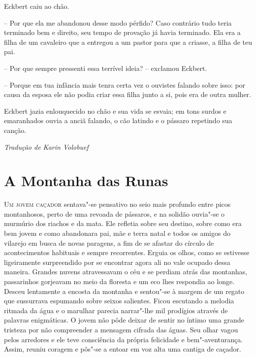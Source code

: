  Eckbert caiu ao chão.

 -- Por que ela me abandonou desse modo pérfido? Caso contrário
tudo teria terminado bem e direito, seu tempo de provação já havia
terminado. Ela era a filha de um cavaleiro que a entregou a um pastor
para que a criasse, a filha de teu pai.

 -- Por que sempre pressenti essa terrível ideia? -- exclamou
Eckbert.

 -- Porque em tua infância mais tenra certa vez o ouvistes falando
sobre isso: por causa da esposa ele não podia criar essa filha junto a
si, pois era de outra mulher.

 Eckbert jazia enlouquecido no chão e sua vida se esvaia; em tons surdos
e emaranhados ouvia a anciã falando, o cão latindo e o pássaro repetindo sua canção.
\medskip

\hfill\textit{Tradução de Karin Volobuef}



\chapter{A Montanha das Runas}

\textsc{Um jovem caçador} sentava"-se pensativo no seio mais profundo entre picos
montanhosos, perto de uma revoada de pássaros, e na solidão ouvia"-se o
murmúrio dos riachos e da mata. Ele refletia sobre seu destino, sobre
como era bem jovem e como abandonara pai, mãe e terra natal e todos os
amigos do vilarejo em busca de novas paragens, a fim de se afastar do
círculo de acontecimentos habituais e sempre recorrentes. Erguia os
olhos, como se estivesse ligeiramente surpreendido por se encontrar
agora ali no vale ocupado dessa maneira. Grandes nuvens atravessavam o céu
e se perdiam atrás das montanhas, passarinhos gorjeavam no meio da
floresta e um eco lhes respondia ao longe. Desceu lentamente a encosta
da montanha e sentou"-se à margem de um regato que sussurrava espumando
sobre seixos salientes. Ficou escutando a melodia ritmada da água e o
marulhar parecia narrar"-lhe mil prodígios através de palavras
enigmáticas. O jovem não pôde deixar de sentir no íntimo uma grande
tristeza por não compreender a mensagem cifrada das águas. Seu olhar
vagou pelos arredores e ele teve consciência da própria felicidade e
bem"-aventurança. Assim, reuniu coragem e pôs"-se a entoar em voz alta
uma cantiga de caçador.

